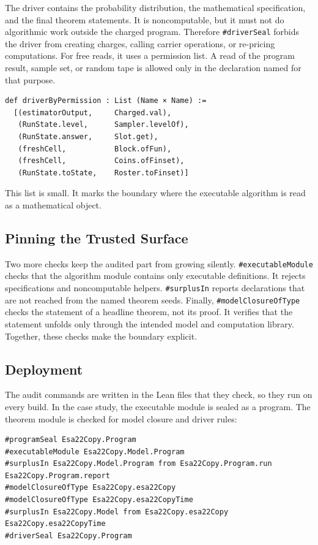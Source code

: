 \documentclass[acmsmall,nonacm]{acmart}
\begin{document}
The driver contains the probability distribution, the mathematical specification, and the final theorem statements.
It is noncomputable, but it must not do algorithmic work outside the charged program.
Therefore \lstinline{#driverSeal} forbids the driver from creating charges, calling carrier operations, or re-pricing computations.
For free reads, it uses a permission list.
A read of the program result, sample set, or random tape is allowed only in the declaration named for that purpose.

\begin{lstlisting}
def driverByPermission : List (Name × Name) :=
  [(estimatorOutput,     Charged.val),
   (RunState.level,      Sampler.levelOf),
   (RunState.answer,     Slot.get),
   (freshCell,           Block.ofFun),
   (freshCell,           Coins.ofFinset),
   (RunState.toState,    Roster.toFinset)]
\end{lstlisting}

This list is small.
It marks the boundary where the executable algorithm is read as a mathematical object.

\subsection{Pinning the Trusted Surface}\label{sec:executable-surplus}

Two more checks keep the audited part from growing silently.
\lstinline{#executableModule} checks that the algorithm module contains only executable definitions.
It rejects specifications and noncomputable helpers.
\lstinline{#surplusIn} reports declarations that are not reached from the named theorem seeds.
Finally, \lstinline{#modelClosureOfType}\label{sec:model-closure} checks the statement of a headline theorem, not its proof.
It verifies that the statement unfolds only through the intended model and computation library.
Together, these checks make the boundary explicit.

\subsection{Deployment}\label{sec:build-commands}

The audit commands are written in the Lean files that they check, so they run on every build.
In the case study, the executable module is sealed as a program.
The theorem module is checked for model closure and driver rules:

\begin{lstlisting}
#programSeal Esa22Copy.Program
#executableModule Esa22Copy.Model.Program
#surplusIn Esa22Copy.Model.Program from Esa22Copy.Program.run Esa22Copy.Program.report
#modelClosureOfType Esa22Copy.esa22Copy
#modelClosureOfType Esa22Copy.esa22CopyTime
#surplusIn Esa22Copy.Model from Esa22Copy.esa22Copy Esa22Copy.esa22CopyTime
#driverSeal Esa22Copy.Program
\end{lstlisting}
\end{document}
